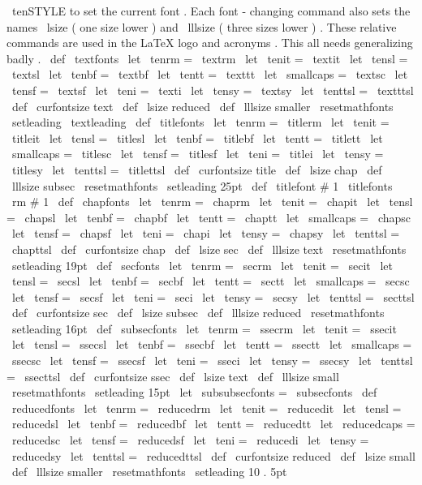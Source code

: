 %
\
tenSTYLE
to
set
the
current
font
.
%
%
Each
font
-
changing
command
also
sets
the
names
\
lsize
(
one
size
lower
)
%
and
\
lllsize
(
three
sizes
lower
)
.
These
relative
commands
are
used
in
%
the
LaTeX
logo
and
acronyms
.
%
%
This
all
needs
generalizing
badly
.
%
\
def
\
textfonts
{
%
\
let
\
tenrm
=
\
textrm
\
let
\
tenit
=
\
textit
\
let
\
tensl
=
\
textsl
\
let
\
tenbf
=
\
textbf
\
let
\
tentt
=
\
texttt
\
let
\
smallcaps
=
\
textsc
\
let
\
tensf
=
\
textsf
\
let
\
teni
=
\
texti
\
let
\
tensy
=
\
textsy
\
let
\
tenttsl
=
\
textttsl
\
def
\
curfontsize
{
text
}
%
\
def
\
lsize
{
reduced
}
\
def
\
lllsize
{
smaller
}
%
\
resetmathfonts
\
setleading
{
\
textleading
}
}
\
def
\
titlefonts
{
%
\
let
\
tenrm
=
\
titlerm
\
let
\
tenit
=
\
titleit
\
let
\
tensl
=
\
titlesl
\
let
\
tenbf
=
\
titlebf
\
let
\
tentt
=
\
titlett
\
let
\
smallcaps
=
\
titlesc
\
let
\
tensf
=
\
titlesf
\
let
\
teni
=
\
titlei
\
let
\
tensy
=
\
titlesy
\
let
\
tenttsl
=
\
titlettsl
\
def
\
curfontsize
{
title
}
%
\
def
\
lsize
{
chap
}
\
def
\
lllsize
{
subsec
}
%
\
resetmathfonts
\
setleading
{
25pt
}
}
\
def
\
titlefont
#
1
{
{
\
titlefonts
\
rm
#
1
}
}
\
def
\
chapfonts
{
%
\
let
\
tenrm
=
\
chaprm
\
let
\
tenit
=
\
chapit
\
let
\
tensl
=
\
chapsl
\
let
\
tenbf
=
\
chapbf
\
let
\
tentt
=
\
chaptt
\
let
\
smallcaps
=
\
chapsc
\
let
\
tensf
=
\
chapsf
\
let
\
teni
=
\
chapi
\
let
\
tensy
=
\
chapsy
\
let
\
tenttsl
=
\
chapttsl
\
def
\
curfontsize
{
chap
}
%
\
def
\
lsize
{
sec
}
\
def
\
lllsize
{
text
}
%
\
resetmathfonts
\
setleading
{
19pt
}
}
\
def
\
secfonts
{
%
\
let
\
tenrm
=
\
secrm
\
let
\
tenit
=
\
secit
\
let
\
tensl
=
\
secsl
\
let
\
tenbf
=
\
secbf
\
let
\
tentt
=
\
sectt
\
let
\
smallcaps
=
\
secsc
\
let
\
tensf
=
\
secsf
\
let
\
teni
=
\
seci
\
let
\
tensy
=
\
secsy
\
let
\
tenttsl
=
\
secttsl
\
def
\
curfontsize
{
sec
}
%
\
def
\
lsize
{
subsec
}
\
def
\
lllsize
{
reduced
}
%
\
resetmathfonts
\
setleading
{
16pt
}
}
\
def
\
subsecfonts
{
%
\
let
\
tenrm
=
\
ssecrm
\
let
\
tenit
=
\
ssecit
\
let
\
tensl
=
\
ssecsl
\
let
\
tenbf
=
\
ssecbf
\
let
\
tentt
=
\
ssectt
\
let
\
smallcaps
=
\
ssecsc
\
let
\
tensf
=
\
ssecsf
\
let
\
teni
=
\
sseci
\
let
\
tensy
=
\
ssecsy
\
let
\
tenttsl
=
\
ssecttsl
\
def
\
curfontsize
{
ssec
}
%
\
def
\
lsize
{
text
}
\
def
\
lllsize
{
small
}
%
\
resetmathfonts
\
setleading
{
15pt
}
}
\
let
\
subsubsecfonts
=
\
subsecfonts
\
def
\
reducedfonts
{
%
\
let
\
tenrm
=
\
reducedrm
\
let
\
tenit
=
\
reducedit
\
let
\
tensl
=
\
reducedsl
\
let
\
tenbf
=
\
reducedbf
\
let
\
tentt
=
\
reducedtt
\
let
\
reducedcaps
=
\
reducedsc
\
let
\
tensf
=
\
reducedsf
\
let
\
teni
=
\
reducedi
\
let
\
tensy
=
\
reducedsy
\
let
\
tenttsl
=
\
reducedttsl
\
def
\
curfontsize
{
reduced
}
%
\
def
\
lsize
{
small
}
\
def
\
lllsize
{
smaller
}
%
\
resetmathfonts
\
setleading
{
10
.
5pt
}
}
